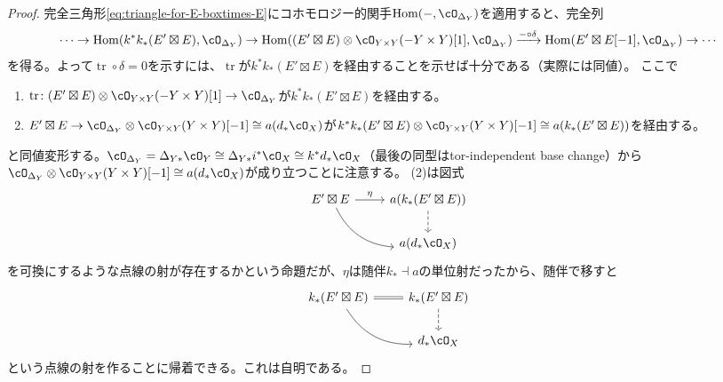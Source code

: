 \documentclass[uplatex, a4paper, dvipdfmx]{jsarticle}
\theoremstyle{definition}
\DeclareMathOperator{\Hom}{\mathrm{Hom}}
\DeclareMathOperator{\tr}{\mathrm{tr}}
\begin{document}
\begin{proof}
    完全三角形\eqref{eq:triangle-for-E-boxtimes-E}にコホモロジー的関手$\Hom(-, \cO_{\Delta_Y})$を適用すると、完全列
    \begin{equation}
        \cdots \to \Hom(k^*k_*(E' \boxtimes E), \cO_{\Delta_Y}) \to \Hom((E' \boxtimes E) \otimes \cO_{Y \times Y}(-Y\times Y)[1], \cO_{\Delta_Y}) \xrightarrow{-\circ \delta} \Hom(E' \boxtimes E[-1], \cO_{\Delta_Y}) \to \cdots
    \end{equation}
    を得る。よって$\tr \circ \delta = 0$を示すには、$\tr$が$k^*k_*(E' \boxtimes E)$を経由することを示せば十分である（実際には同値）。
    ここで
    \begin{enumerate}
        \item $\tr \colon(E' \boxtimes E) \otimes \cO_{Y \times Y}(-Y\times Y)[1] \to \cO_{\Delta_Y}$が$k^*k_*(E' \boxtimes E)$を経由する。
        \item $E'\boxtimes E \to \cO_{\Delta_Y} \otimes  \cO_{Y \times Y}(Y\times Y)[-1] \cong a(d_*\cO_X)$が$k^*k_*(E' \boxtimes E) \otimes  \cO_{Y \times Y}(Y\times Y)[-1] \cong a(k_*(E' \boxtimes E))$を経由する。
    \end{enumerate}
    と同値変形する。$\cO_{\Delta_Y} = \Delta_{Y*}\cO_Y \cong \Delta_{Y*}i^*\cO_X \cong k^*d_*\cO_X$（最後の同型はtor-independent base change）から$\cO_{\Delta_Y} \otimes \cO_{Y \times Y}(Y\times Y)[-1] \cong a(d_*\cO_X)$が成り立つことに注意する。
    (2)は図式
    \[
        \begin{tikzcd}
            E' \boxtimes E \ar[r, "\eta"] \ar[rd, bend right] &a(k_*(E' \boxtimes E))\ar[d, dashed] \\
            & a(d_*\cO_X)
        \end{tikzcd}
    \]
    を可換にするような点線の射が存在するかという命題だが、$\eta$は随伴$k_* \dashv a$の単位射だったから、随伴で移すと
    \[
        \begin{tikzcd}
            k_*(E' \boxtimes E) \ar[r, equal] \ar[rd, bend right] &k_*(E' \boxtimes E)\ar[d, dashed] \\
            & d_*\cO_X
        \end{tikzcd}
    \]
    という点線の射を作ることに帰着できる。これは自明である。
\end{proof}
\end{document}
